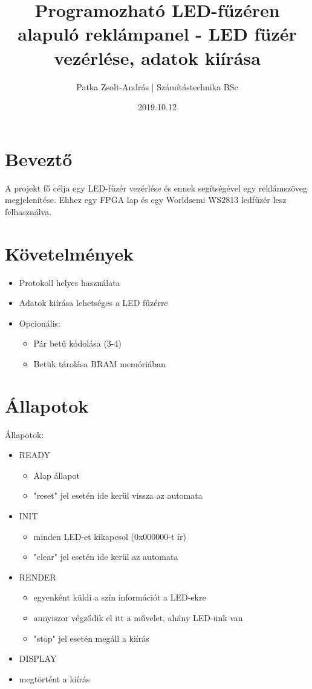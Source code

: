 \documentclass[10pt]{article} %
\title{Programozható LED-fűzéren alapuló reklámpanel - LED füzér vezérlése, adatok kiírása}
\author{Patka Zsolt-András | Számítástechnika BSc}
\date{2019.10.12}
\begin{document}
\maketitle

\section{Beveztő}

A projekt fő célja egy LED-fűzér vezérlése és ennek segítségével egy reklámszöveg megjelenítése. Ehhez egy FPGA lap és egy Worldsemi WS2813 ledfűzér lesz felhasználva.

\section{Követelmények}

\begin{itemize}
\item Protokoll helyes használata
\item Adatok kiírása lehetséges a LED fűzérre
\item Opcionális: 
\begin{itemize}
	\item Pár betű kódolása (3-4)
	\item Betük tárolása BRAM memóriában
\end{itemize}	
\end{itemize}

\section{Állapotok}

Állapotok:
\begin{itemize}
\item READY
	\begin{itemize}
	\item Alap állapot 
	\item "reset" jel esetén ide kerül vissza az automata
	\end{itemize}
\item INIT
	\begin{itemize}
	\item minden LED-et kikapcsol (0x000000-t ír)
	\item "clear" jel esetén ide kerül az automata
	\end{itemize}
\item RENDER
	\begin{itemize}
	\item egyenként küldi a szín információt a LED-ekre
	\item annyiszor végződik el itt a művelet, ahány LED-ünk van
	\item "stop" jel esetén megáll a kiírás
	\end{itemize}
\item DISPLAY
	\item megtörtént a kiírás
\end{itemize}
\end{document}
